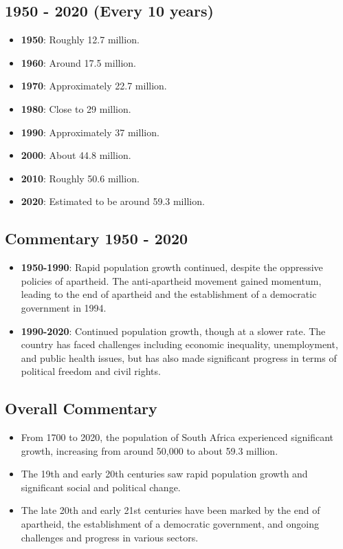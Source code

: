 \subsection*{1950 - 2020 (Every 10 years)}
\begin{itemize}
    \item \textbf{1950}: Roughly 12.7 million.
    \item \textbf{1960}: Around 17.5 million.
    \item \textbf{1970}: Approximately 22.7 million.
    \item \textbf{1980}: Close to 29 million.
    \item \textbf{1990}: Approximately 37 million.
    \item \textbf{2000}: About 44.8 million.
    \item \textbf{2010}: Roughly 50.6 million.
    \item \textbf{2020}: Estimated to be around 59.3 million.
\end{itemize}

\subsection*{Commentary 1950 - 2020}
\begin{itemize}
    \item \textbf{1950-1990}: Rapid population growth continued, despite the oppressive policies of apartheid. The anti-apartheid movement gained momentum, leading to the end of apartheid and the establishment of a democratic government in 1994.
    \item \textbf{1990-2020}: Continued population growth, though at a slower rate. The country has faced challenges including economic inequality, unemployment, and public health issues, but has also made significant progress in terms of political freedom and civil rights.
\end{itemize}

\subsection*{Overall Commentary}
\begin{itemize}
    \item From 1700 to 2020, the population of South Africa experienced significant growth, increasing from around 50,000 to about 59.3 million.
    \item The 19th and early 20th centuries saw rapid population growth and significant social and political change.
    \item The late 20th and early 21st centuries have been marked by the end of apartheid, the establishment of a democratic government, and ongoing challenges and progress in various sectors.
\end{itemize}
